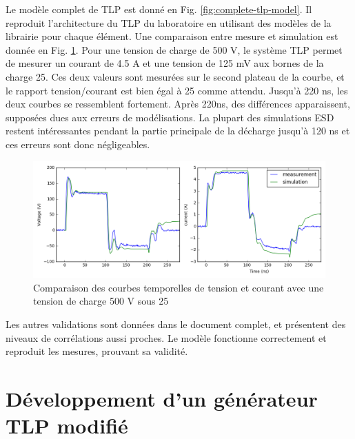 Le modèle complet de TLP est donné en Fig. \ref{fig:complete-tlp-model}.
Il reproduit l'architecture du TLP du laboratoire en utilisant des modèles de la librairie pour chaque élément.
Une comparaison entre mesure et simulation est donnée en Fig. \ref{fig:comparison-tlp-load}.
Pour une tension de charge de 500 V, le système TLP permet de mesurer un courant de 4.5 A et une tension de 125 mV aux bornes de la charge 25\textOmega{}.
Ces deux valeurs sont mesurées sur le second plateau de la courbe, et le rapport tension/courant est bien égal à 25\textOmega{} comme attendu.
Jusqu'à 220 ns, les deux courbes se ressemblent fortement.
Après 220ns, des différences apparaissent, supposées dues aux erreurs de modélisations.
La plupart des simulations ESD restent intéressantes pendant la partie principale de la décharge jusqu'à 120 ns et ces erreurs sont donc négligeables.

\begin{figure}[!h]
  \centering
  \includegraphics[width=\textwidth]{src/1/figures/tlp_comparison_R25_500V.png}
  \caption{Comparaison des courbes temporelles de tension et courant avec une  tension de charge 500 V sous 25\textOmega{}}
  \label{fig:comparison-tlp-load}
\end{figure}

Les autres validations sont données dans le document complet, et présentent des niveaux de corrélations aussi proches.
Le modèle fonctionne correctement et reproduit les mesures, prouvant sa validité.

\section{Développement d'un générateur TLP modifié}

